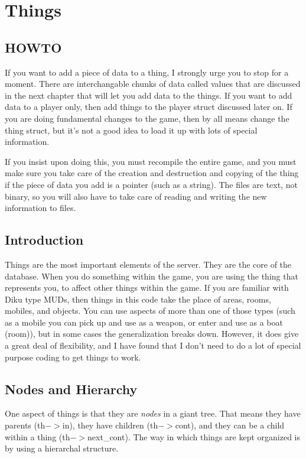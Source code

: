 \chapter{Things}

\section{HOWTO}

If you want to add a piece of data to a thing, I strongly urge
you to stop for a moment. There are interchangable chunks of
data called values that are discussed in the next chapter that
will let you add data to the things. If you want to add data
to a player only, then add things to the player struct discussed
later on. If you are doing fundamental changes to the game,
then by all means change the thing struct, but it's not a good
idea to load it up with lots of special information.

If you insist upon doing this, you must recompile the entire game,
and you must make sure you take care of the creation and
destruction and copying of the thing if the piece of data you
add is a pointer (such as a string). The files are text, not
binary, so you will also have to take care of reading and writing
the new information to files.

\section{Introduction}

Things are the most important elements of the server. They are the
core of the database. When you do something within the game, you are
using the thing that represents you, to affect other things within the
game. If you are familiar with Diku type MUDs, then things in this
code take the place of areas, rooms, mobiles, and objects. You can use
aspects of more than one of those types (such as a mobile you can pick
up and use as a weapon, or enter and use as a boat (room)), but in
some cases the generalization breaks down. However, it does give a
great deal of flexibility, and I have found that I don't need to do a
lot of special purpose coding to get things to work.

\section{Nodes and Hierarchy}

One aspect of things is that they are {\it{nodes}} in a giant
tree. That means they have parents (th$->$in), they have children
(th$->$cont), and they can be a child within a thing
(th$->$next\_cont). The way in which things are kept organized is by
using a hierarchal structure.

